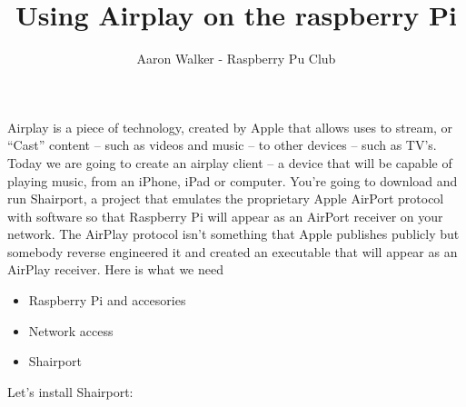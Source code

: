 \documentclass[11pt, oneside]{amsart}
\title{Using Airplay on the raspberry Pi}
\author{Aaron Walker - Raspberry Pu Club}
\begin{document}
\maketitle

Airplay is a piece of technology, created by Apple  that allows uses to stream, or “Cast” content – such as videos and music – to other devices – such as TV’s. Today we are going to create an airplay client – a device that will be capable of playing music, from an iPhone, iPad or computer. You’re going to download and run Shairport, a project that emulates the proprietary Apple AirPort protocol with software so that Raspberry Pi will appear as an AirPort receiver on your network. The AirPlay protocol isn’t something that Apple publishes publicly but somebody reverse engineered it and created an executable that will appear as an AirPlay receiver. Here is what we need
\begin{itemize}
  \item Raspberry Pi and accesories
  \item Network access
  \item Shairport
\end{itemize}

Let's install Shairport:
\end{document}
